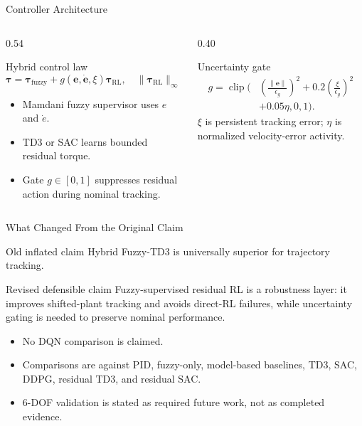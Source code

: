 \documentclass[aspectratio=169,10pt]{beamer}
\begin{document}
\begin{frame}{Controller Architecture}
  \begin{columns}[T,onlytextwidth]
    \begin{column}{0.54\textwidth}
      \begin{block}{Hybrid control law}
        \[
          \bm{\tau}=\bm{\tau}_{\mathrm{fuzzy}}+g(\bm{e},\dot{\bm{e}},\xi)\bm{\tau}_{\mathrm{RL}},
          \quad \|\bm{\tau}_{\mathrm{RL}}\|_\infty \leq \bar{\tau}_r .
        \]
      \end{block}
      \begin{itemize}
        \item Mamdani fuzzy supervisor uses $e$ and $\dot e$.
        \item TD3 or SAC learns bounded residual torque.
        \item Gate $g\in[0,1]$ suppresses residual action during nominal tracking.
      \end{itemize}
    \end{column}
    \begin{column}{0.40\textwidth}
      \begin{block}{Uncertainty gate}
        \[
        \begin{aligned}
        g=\operatorname{clip}\bigg(&
        \left(\frac{\|\bm e\|}{\epsilon_g}\right)^2
        +0.2\left(\frac{\xi}{\epsilon_g}\right)^2\\
        &+0.05\eta,0,1\bigg).
        \end{aligned}
        \]
        \small $\xi$ is persistent tracking error; $\eta$ is normalized velocity-error activity.
      \end{block}
    \end{column}
  \end{columns}
\end{frame}

\begin{frame}{What Changed From the Original Claim}
  \begin{block}{Old inflated claim}
    Hybrid Fuzzy-TD3 is universally superior for trajectory tracking.
  \end{block}
  \begin{block}{Revised defensible claim}
    Fuzzy-supervised residual RL is a robustness layer: it improves shifted-plant tracking and avoids direct-RL failures, while uncertainty gating is needed to preserve nominal performance.
  \end{block}
  \begin{itemize}
    \item No DQN comparison is claimed.
    \item Comparisons are against PID, fuzzy-only, model-based baselines, TD3, SAC, DDPG, residual TD3, and residual SAC.
    \item 6-DOF validation is stated as required future work, not as completed evidence.
  \end{itemize}
\end{frame}
\end{document}
